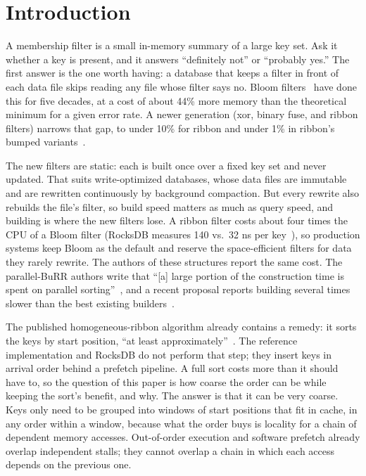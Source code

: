 \documentclass{article}
\begin{document}
\section{Introduction}
A membership filter is a small in-memory summary of a large key set. Ask it whether a key is present, and it answers ``definitely not'' or ``probably yes.'' The first answer is the one worth having: a database that keeps a filter in front of each data file skips reading any file whose filter says no. Bloom filters~\citep{bloom1970space} have done this for five decades, at a cost of about 44\% more memory than the theoretical minimum for a given error rate. A newer generation (xor, binary fuse, and ribbon filters) narrows that gap, to under 10\% for ribbon and under 1\% in ribbon's bumped variants~\citep{dillinger2021ribbon,dillinger2022burr}.

The new filters are static: each is built once over a fixed key set and never updated. That suits write-optimized databases, whose data files are immutable and are rewritten continuously by background compaction. But every rewrite also rebuilds the file's filter, so build speed matters as much as query speed, and building is where the new filters lose. A ribbon filter costs about four times the CPU of a Bloom filter (RocksDB measures 140 vs.\ 32 ns per key~\citep{rocksdbribbonblog}), so production systems keep Bloom as the default and reserve the space-efficient filters for data they rarely rewrite. The authors of these structures report the same cost. The parallel-BuRR authors write that ``[a] large portion of the construction time is spent on parallel sorting''~\citep{becht2024parallelburr}, and a recent proposal reports building several times slower than the best existing builders~\citep{limasset2026zor}.

The published homogeneous-ribbon algorithm already contains a remedy: it sorts the keys by start position, ``at least approximately''~\citep{dietzfelbinger2026ribbon}. The reference implementation and RocksDB do not perform that step; they insert keys in arrival order behind a prefetch pipeline. A full sort costs more than it should have to, so the question of this paper is how coarse the order can be while keeping the sort's benefit, and why. The answer is that it can be very coarse. Keys only need to be grouped into windows of start positions that fit in cache, in any order within a window, because what the order buys is locality for a chain of dependent memory accesses. Out-of-order execution and software prefetch already overlap independent stalls; they cannot overlap a chain in which each access depends on the previous one.
\end{document}
